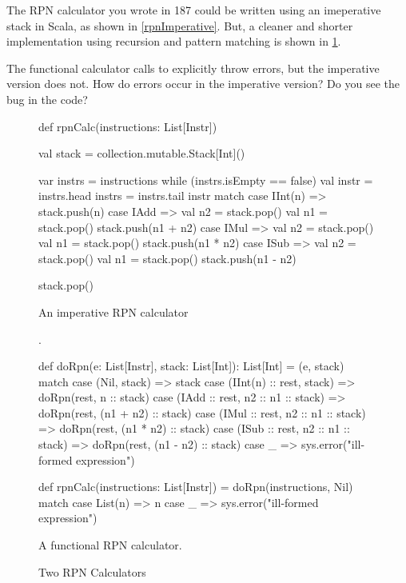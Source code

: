 \documentclass{book}
\begin{document}
The RPN calculator you wrote in 187 could be written using an imeperative stack
in Scala, as shown in \cref{rpnImperative}. But, a cleaner and shorter
implementation using recursion and pattern matching is shown in \cref{rpnCalc}.

\begin{think}
The functional calculator calls  to explicitly throw
errors, but the imperative version does not. How do errors occur in the
imperative version? Do you see the bug in the code?
\end{think}

\begin{figure}
\begin{minipage}{0.45\textwidth}
\begin{scalacode}
def rpnCalc(instructions: List[Instr]) {
  val stack = collection.mutable.Stack[Int]()

  var instrs = instructions
  while (instrs.isEmpty == false) {
    val instr = instrs.head
    instrs = instrs.tail
    instr match {
      case IInt(n) => stack.push(n)
      case IAdd => {
        val n2 = stack.pop()
        val n1 = stack.pop()
        stack.push(n1 + n2)
      }
      case IMul => {
        val n2 = stack.pop()
        val n1 = stack.pop()
        stack.push(n1 * n2)
      }
      case ISub => {
        val n2 = stack.pop()
        val n1 = stack.pop()
        stack.push(n1 - n2)
      }
    }
  }

  stack.pop()
}
\end{scalacode}
\caption{An imperative RPN calculator}.
\end{minipage}
\quad
\vrule
\quad
\begin{minipage}{0.45\textwidth}
\begin{scalacode}
def doRpn(e: List[Instr], stack: List[Int]): List[Int] =
  (e, stack) match {
    case (Nil, stack) => stack
    case (IInt(n) :: rest, stack) => doRpn(rest, n :: stack)
    case (IAdd :: rest, n2 :: n1 :: stack) =>
      doRpn(rest, (n1 + n2) :: stack)
    case (IMul :: rest, n2 :: n1 :: stack) =>
      doRpn(rest, (n1 * n2) :: stack)
    case (ISub :: rest, n2 :: n1 :: stack) =>
      doRpn(rest, (n1 - n2) :: stack)
    case _ => sys.error("ill-formed expression")
  }

def rpnCalc(instructions: List[Instr]) =
  doRpn(instructions, Nil) match {
    case List(n) => n
    case _ => sys.error("ill-formed expression")
  }
\end{scalacode}
\caption{A functional RPN calculator.}
\label{rpnCalc}
\end{minipage}
\caption{Two RPN Calculators}
\end{figure}
\end{document}
